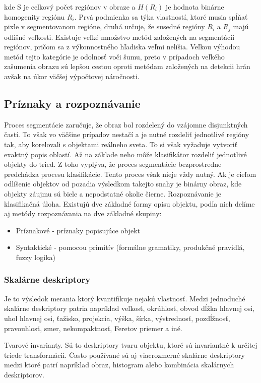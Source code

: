 kde S je celkový počet regiónov v obraze a $H(R_i)$ je hodnota binárne homogenity regiónu $R_i$. Prvá podmienka sa týka vlastností, ktoré musia spĺňať pixle v segmentovanom regióne, druhá určuje, že susedné regióny $R_i$ a $R_j$ majú odlišné veľkosti. Existuje veľké množstvo metód založených na segmentácii regiónov, pričom sa z výkonnostného hľadiska veľmi nelíšia. Veľkou výhodou metód tejto kategórie je odolnosť voči šumu, preto v prípadoch veľkého zašumenia obrazu sú lepšou cestou oproti metódam založených na detekcii hrán avšak na úkor väčšej výpočtovej náročnosti.  

\subsection{Príznaky a rozpoznávanie}
Proces segmentácie zaručuje, že obraz bol rozdelený do vzájomne disjunktných častí. To však vo väčšine prípadov nestačí a je nutné rozdeliť jednotlivé regióny tak, aby korelovali s objektami reálneho sveta. To si však vyžaduje vytvoriť exaktný popis oblastí. Až na základe neho môže klasifikátor rozdeliť jednotlivé objekty do tried.  Z toho vyplýva, že proces segmentácie bezprostredne predchádza procesu klasifikácie.  Tento proces však nieje vždy nutný. Ak je cieľom odlíšenie objektov od pozadia výsledkom takejto snahy je binárny obraz, kde objekty záujmu sú biele a nepodstatné okolie čierne.
Rozpoznávanie je klasifikačná úloha. Existujú dve základné formy opisu objektu, podľa nich delíme aj metódy rozpoznávania na dve základné skupiny: 

\begin{itemize}
\item Príznakové - príznaky popisujúce objekt 
\item Syntaktické - pomocou primitív (formálne gramatiky, produkčné pravidlá, fuzzy logika)
\end{itemize}

\subsubsection{Skalárne deskriptory}
Je to výsledok merania ktorý kvantifikuje nejakú vlastnosť. Medzi jednoduché skalárne deskriptory  patria napríklad veľkosť,  okrúhlosť, obvod dĺžka hlavnej osi, uhol hlavnej osi, ťažisko,  projekcia, výška, šírka, výstrednosť, pozdĺžnosť, pravouhlosť, smer, nekompaktnosť, Feretov priemer a iné. 

Tvarové invarianty. Sú to deskriptory tvaru objektu, ktoré sú invariantné k určitej triede transformácii.
Často používané sú aj viacrozmerné skalárne deskriptory medzi ktoré patrí napríklad obraz, histogram alebo kombinácia skalárnych deskriptorov.

